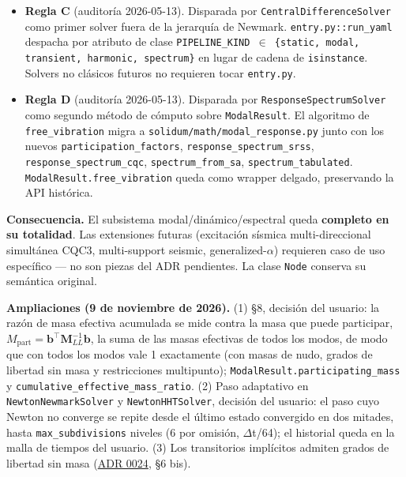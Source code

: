 \documentclass[11pt,oneside]{report}
\begin{document}
\begin{itemize}
  \item \textbf{Regla C} (auditoría 2026-05-13). Disparada por \texttt{CentralDifferenceSolver} como primer solver fuera de la jerarquía de Newmark. \texttt{entry.\allowbreak{}py::run\_\allowbreak{}yaml} despacha por atributo de clase \texttt{PIPELINE\_\allowbreak{}KIND \ensuremath{\in} \{\textquotedbl{}static\textquotedbl{}, \textquotedbl{}modal\textquotedbl{}, \textquotedbl{}transient\textquotedbl{}, \textquotedbl{}harmonic\textquotedbl{}, \textquotedbl{}spectrum\textquotedbl{}\}} en lugar de cadena de \texttt{isinstance}. Solvers no clásicos futuros no requieren tocar \texttt{entry.py}.
  \item \textbf{Regla D} (auditoría 2026-05-13). Disparada por \texttt{ResponseSpectrumSolver} como segundo método de cómputo sobre \texttt{ModalResult}. El algoritmo de \texttt{free\_vibration} migra a \texttt{solidum/\allowbreak{}math/\allowbreak{}modal\_\allowbreak{}response.\allowbreak{}py} junto con los nuevos \texttt{participation\_\allowbreak{}factors}, \texttt{response\_\allowbreak{}spectrum\_\allowbreak{}srss}, \texttt{response\_\allowbreak{}spectrum\_\allowbreak{}cqc}, \texttt{spectrum\_from\_sa}, \texttt{spectrum\_\allowbreak{}tabulated}. \texttt{ModalResult.\allowbreak{}free\_\allowbreak{}vibration} queda como wrapper delgado, preservando la API histórica.
\end{itemize}

\textbf{Consecuencia.} El subsistema modal/dinámico/espectral queda \textbf{completo en su totalidad}. Las extensiones futuras (excitación sísmica multi-direccional simultánea CQC3, multi-support seismic, generalized-\ensuremath{\alpha}) requieren caso de uso específico --- no son piezas del ADR pendientes. La clase \texttt{Node} conserva su semántica original.

\textbf{Ampliaciones (9 de noviembre de 2026).} (1) §8, decisión del usuario: la razón de masa efectiva acumulada se mide contra la masa que puede participar, $M_\text{part} = \mathbf b^\top\mathbf M_{LL}^{-1}\mathbf b$, la suma de las masas efectivas de todos los modos, de modo que con todos los modos vale 1 exactamente (con masas de nudo, grados de libertad sin masa y restricciones multipunto); \texttt{ModalResult.\allowbreak{}participating\_\allowbreak{}mass} y \texttt{cumulative\_\allowbreak{}effective\_\allowbreak{}mass\_\allowbreak{}ratio}. (2) Paso adaptativo en \texttt{NewtonNewmarkSolver} y \texttt{NewtonHHTSolver}, decisión del usuario: el paso cuyo Newton no converge se repite desde el último estado convergido en dos mitades, hasta \texttt{max\_subdivisions} niveles (6 por omisión, \ensuremath{\Delta}t/64); el historial queda en la malla de tiempos del usuario. (3) Los transitorios implícitos admiten grados de libertad sin masa (\hyperref[adr:0024]{ADR 0024}, §6 bis).
\end{document}
